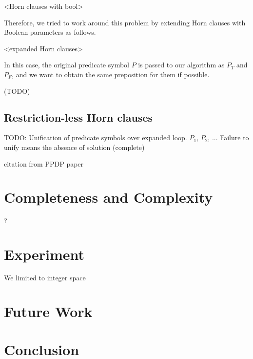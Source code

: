 \documentclass{llncs}
\begin{document}
<Horn clauses with bool>

Therefore, we tried to work around this problem by extending Horn clauses with Boolean parameters as follows.

<expanded Horn clauses>

In this case, the original predicate symbol $P$ is passed to our algorithm as $P_T$ and $P_F$, and we want to obtain the same preposition for them if possible.

(TODO)


\subsection{Restriction-less Horn clauses}

TODO:
Unification of predicate symbols over expanded loop.
$P_1$, $P_2$, ...
Failure to unify means the absence of solution (complete)

citation from PPDP paper


\section{Completeness and Complexity}

?

\section{Experiment}

We limited to integer space

\section{Future Work}
\section{Conclusion}



\end{document}
